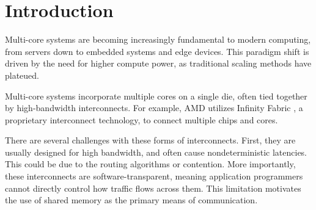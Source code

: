 \section{Introduction}
\label{sec:introduction}





  Multi-core systems are becoming increasingly fundamental to modern computing, from servers down to embedded systems and edge devices. This paradigm shift is driven by the need for higher compute power, as traditional scaling methods have plateued. 

  Multi-core systems incorporate multiple cores on a single die, often tied together by high-bandwidth interconnects. For example, AMD utilizes Infinity Fabric \cite{AMD:CDNA3:WhitePaper}, a proprietary interconnect technology, to connect multiple chips and cores.

  There are several challenges with these forms of interconnects. First, they are usually designed for high bandwidth, and often cause nondeterministic latencies. This could be due to the routing algorithms or contention. More importantly, these interconnects are software-transparent, meaning application programmers cannot directly control how traffic flows across them. 
  This limitation motivates the use of shared memory \cite{Aspnes:IPC:Wiki} as the primary means of communication.

